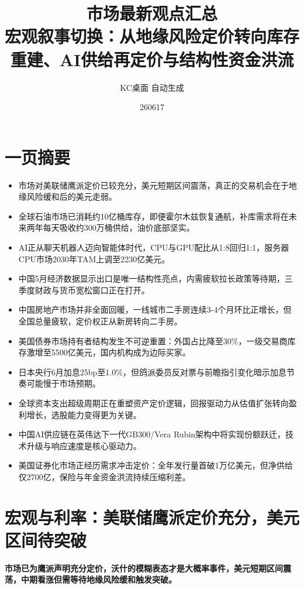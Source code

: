 \documentclass[11pt]{ctexart}
\title{\textbf{市场最新观点汇总}\\[0.4em]{\large 宏观叙事切换：从地缘风险定价转向库存重建、AI供给再定价与结构性资金洪流}}
\author{KC桌面 自动生成}
\date{260617}
\begin{document}
\maketitle
\tableofcontents
\newpage
\section{一页摘要}
\begin{itemize}
  \item 市场对美联储鹰派定价已较充分，美元短期区间震荡，真正的交易机会在于地缘风险缓和后的美元走弱。
  \item 全球石油市场已消耗约10亿桶库存，即便霍尔木兹恢复通航，补库需求将在未来两年每天吸收约300万桶供给，油价底部坚实。
  \item AI正从聊天机器人迈向智能体时代，CPU与GPU配比从1:8回归1:1，服务器CPU市场2030年TAM上调至2230亿美元。
  \item 中国5月经济数据显示出口是唯一结构性亮点，内需疲软拉长政策等待期，三季度财政与货币宽松窗口正在打开。
  \item 中国房地产市场并非全面回暖，一线城市二手房连续3-4个月环比正增长，但全国总量疲软，定价权正从新房转向二手房。
  \item 美国债券市场持有者结构发生不可逆重置：外国占比降至30\%，一级交易商库存激增至5500亿美元，国内机构成为边际买家。
  \item 日本央行6月加息25bp至1.0\%，但鸽派委员反对票与前瞻指引变化暗示加息节奏可能慢于市场预期。
  \item 全球资本支出超级周期正在重塑资产定价逻辑，回报驱动力从估值扩张转向盈利增长，选股能力变得更为关键。
  \item 中国AI供应链在英伟达下一代GB300/Vera Rubin架构中将实现份额跃迁，技术升级与响应速度是核心驱动力。
  \item 美国证券化市场正经历需求冲击定价：全年发行量首破1万亿美元，但净供给仅2700亿，保险与年金资金洪流持续压缩利差。
\end{itemize}
\section{宏观与利率：美联储鹰派定价充分，美元区间待突破}
\textbf{市场已为鹰派声明充分定价，沃什的模糊表态才是大概率事件，美元短期区间震荡，中期看涨但需等待地缘风险缓和触发突破。}
\end{document}
